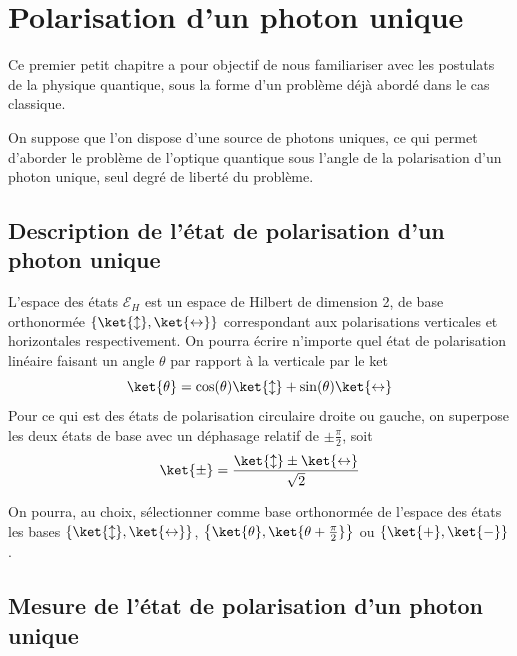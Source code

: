 \section{Polarisation d’un photon unique}

    Ce premier petit chapitre a pour objectif de nous familiariser avec les postulats de la physique quantique, sous la forme d’un problème déjà abordé dans le cas classique.

    On suppose que l’on dispose d’une source de photons uniques, ce qui permet d’aborder le problème de l’optique quantique sous l’angle de la polarisation d’un photon unique, seul degré de liberté du problème. 

        \subsection{Description de l’état de polarisation d’un photon unique}

        L’espace des états $\mathcal{E}_H$ est un espace de Hilbert de dimension 2, de base orthonormée $\left\{\ket{\updownarrow}, \ket{\leftrightarrow}\right\}$ correspondant aux polarisations verticales et horizontales respectivement. On pourra écrire n’importe quel état de polarisation linéaire faisant un angle $\theta$ par rapport à la verticale par le ket 
        \[ \ket{\theta} = \cos(\theta) \ket{\updownarrow} + \sin(\theta) \ket{\leftrightarrow} \]   
        Pour ce qui est des états de polarisation circulaire droite ou gauche, on superpose les deux états de base avec un déphasage relatif de $\pm \frac{\pi}{2}$, soit 
        \[ \ket{\pm} = \frac{\ket{\updownarrow} \pm \ket{\leftrightarrow}}{\sqrt{2}} \]

        On pourra, au choix, sélectionner comme base orthonormée de l’espace des états les bases $\left\{\ket{\updownarrow}, \ket{\leftrightarrow}\right\}$, $\left\{\ket{\theta}, \ket{\theta + \frac{\pi}{2}}\right\}$ ou $\left\{\ket{+}, \ket{-}\right\}$.

        \subsection{Mesure de l’état de polarisation d’un photon unique}

